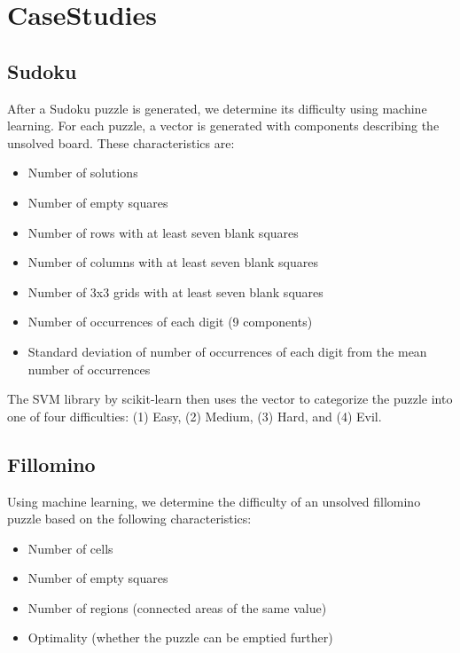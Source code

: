 \section{CaseStudies}

\subsection{Sudoku}

After a Sudoku puzzle is generated, we determine its difficulty using machine learning. For each puzzle, a vector is generated with components describing the unsolved board. These characteristics are:
\begin{itemize}
\item Number of solutions
\item Number of empty squares
\item Number of rows with at least seven blank squares
\item Number of columns with at least seven blank squares
\item Number of 3x3 grids with at least seven blank squares
\item Number of occurrences of each digit (9 components)
\item Standard deviation of number of occurrences of each digit from the mean number of occurrences
\end{itemize}

The SVM library by scikit-learn then uses the vector to categorize the puzzle into one of four difficulties: (1) Easy, (2) Medium, (3) Hard, and (4) Evil.

\subsection{Fillomino}

Using machine learning, we determine the difficulty of an unsolved fillomino puzzle based on the following characteristics:

\begin{itemize}
\item Number of cells
\item Number of empty squares
\item Number of regions (connected areas of the same value)
\item Optimality (whether the puzzle can be emptied further)
\end{itemize}